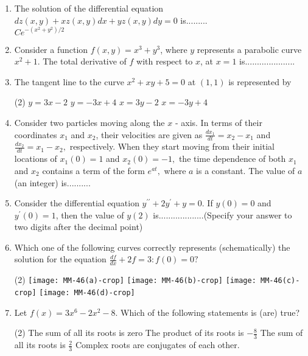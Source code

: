 \begin{enumerate}[label=\color{ocre}\textbf{\arabic*.}]	
\item The solution of the differential equation $d z(x, y)+x z(x, y) d x+y z(x, y) d y=0$ is.........{}\\
$C e^{-\left(x^{2}+y^{2}\right) / 2}$

\item  Consider a function $f(x, y)=x^{3}+y^{3}$, where $y$ represents a parabolic curve $x^{2}+1$. The total derivative of $f$ with respect to $x$, at $x=1$ is.....................
{}
\item The tangent line to the curve $x^{2}+x y+5=0$ at $(1,1)$ is represented by
\begin{tasks}(2)
	\task[\textbf{a.}]$y=3 x-2$ 
	\task[\textbf{b.}]$y=-3 x+4$
	\task[\textbf{c.}]$x=3 y-2$ 
	\task[\textbf{d.}]$x=-3 y+4$  
\end{tasks}

\item Consider two particles moving along the $x$ - axis. In terms of their coordinates $x_{1}$ and $x_{2}$,
their velocities are given as $\frac{d x_{1}}{d t}=x_{2}-x_{1}$ and $\frac{d x_{2}}{d t}=x_{1}-x_{2},$ respectively. When they start
moving from their initial locations of $x_{1}(0)=1$ and $x_{2}(0)=-1,$ the time dependence of
both $x_{1}$ and $x_{2}$ contains a term of the form $e^{a t},$ where $a$ is a constant. The value of $a$
(an integer) is..........{}
\item Consider the differential equation $y^{\prime \prime}+2 y^{\prime}+y=0$. If $y(0)=0$ and $y^{\prime}(0)=1$, then the
value of $y(2)$ is...................(Specify your answer to two digits after the decimal point){}
\item Which one of the following curves correctly represents (schematically) the solution for
the equation $\frac{d f}{d x}+2 f=3: f(0)=0 ?${}
\begin{tasks}(2)
	\task[\textbf{a.}]\texttt{[image: MM-46(a)-crop]}
	\task[\textbf{b.}]\texttt{[image: MM-46(b)-crop]}
	\task[\textbf{c.}] \texttt{[image: MM-46(c)-crop]}
	\task[\textbf{d.}]\texttt{[image: MM-46(d)-crop]} 
\end{tasks}
\item Let $f(x)=3 x^{6}-2 x^{2}-8$. Which of the following statements is (are) true?{}
\begin{tasks}(2)
	\task[\textbf{a.}]  The sum of all its roots is zero
	\task[\textbf{b.}]The product of its roots is $-\frac{8}{3}$
	\task[\textbf{c.}] The sum of all its roots is $\frac{2}{3}$
	\task[\textbf{d.}]  Complex roots are conjugates of each other.
\end{tasks}

\end{enumerate}
